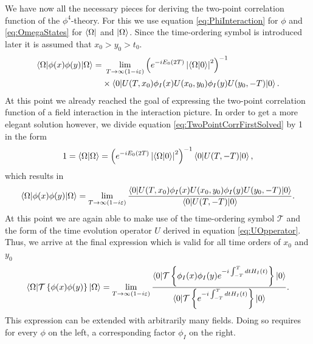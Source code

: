 We have now all the necessary pieces for deriving the two-point correlation function of the $\phi^4$-theory. For this we use equation \ref{eq:PhiInteraction} for $\phi$ and \ref{eq:OmegaStates} for $\bra{\Omega}$ and $\ket{\Omega}$. Since the time-ordering symbol is introduced later it is assumed that $x_0 > y_0 > t_0$.
\begin{align}\label{eq:TwoPointCorrFirstSolved}
 \braket{\Omega|\phi(x)\phi(y)|\Omega} =&\ \lim_{T\to \infty(1-i\varepsilon)} \left( e^{-iE_0(2T)}\left|\braket{\Omega | 0}\right|^2 \right)^{-1} \\ \nonumber
                                        & \times \braket{0|U(T,x_0)\phi_I(x)U(x_0,y_0)\phi_I(y)U(y_0,-T)|0}.
\end{align}
At this point we already reached the goal of expressing the two-point correlation function of a field interaction in the interaction picture. In order to get a more elegant solution however, we divide equation \ref{eq:TwoPointCorrFirstSolved} by 1 in the form
\begin{equation}
    1 = \braket{\Omega|\Omega} = \left( e^{-iE_0(2T)}\left|\braket{\Omega | 0}\right|^2 \right)^{-1} \braket{0|U(T,-T)|0},
\end{equation}
which results in
\begin{equation}
    \braket{\Omega|\phi(x)\phi(y)|\Omega} = \lim_{T\to \infty(1-i\varepsilon)} \frac{\braket{0|U(T,x_0)\phi_I(x)U(x_0,y_0)\phi_I(y)U(y_0,-T)|0}}{\braket{0|U(T,-T)|0}}.
\end{equation}
At this point we are again able to make use of the time-ordering symbol $\mathcal{T}$ and the form of the time evolution operator $U$ derived in equation \ref{eq:UOpperator}. Thus, we arrive at the final expression which is valid for all time orders of $x_0$ and $y_0$
\begin{equation}\label{eq:TwoPointCorrSolved}
    \braket{\Omega|\mathcal{T}\left\{\phi(x)\phi(y)\right\}|\Omega} = \lim_{T\to \infty(1-i\varepsilon)} 
    \frac{\braket{0|\mathcal{T}\left\{ \phi_I(x)\phi_I(y) e^{-i\int_{-T}^T dt H_I(t)} \right\}|0}}{\braket{0|\mathcal{T}\left\{ e^{-i\int_{-T}^T dt H_I(t)}\right\}|0}}.
\end{equation}
This expression can be extended with arbitrarily many fields. Doing so requires for every $\phi$ on the left, a corresponding factor $\phi_I$ on the right. 

